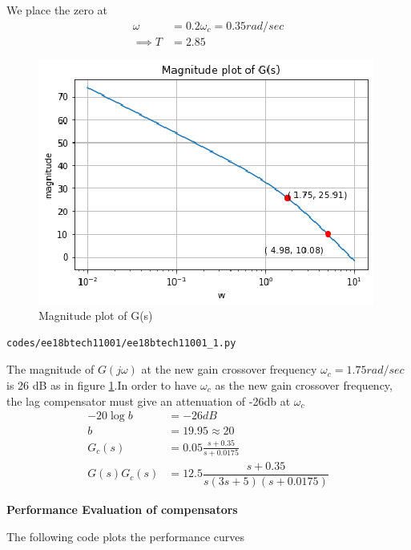 We place the zero at 
\begin{align} 
   \omega &= 0.2\omega_{c} = 0.35 rad/sec 
   \\
   \implies T &= 2.85
\end{align}
\begin{figure}[!ht]
\centering
    \includegraphics[width=\columnwidth]{./figs/ee18btech11001/ee18btech11001_2.eps}
  \caption{Magnitude plot of G(s)}
  \label{fig:ee18btech11001_fig3}
\end{figure}
\begin{lstlisting}
codes/ee18btech11001/ee18btech11001_1.py
\end{lstlisting}

The magnitude of $G(j\omega)$ at the new gain crossover frequency  $\omega_{c} = 1.75 rad/sec$ is 26 dB as in figure \ref{fig:ee18btech11001_fig3}.In order to have $\omega_{c}$  as the new gain crossover frequency, the lag compensator
must give an attenuation of -26db at $\omega_{c}$
\begin{align}
    -20 \log{b} &= -26dB
    \\
    b &= 19.95 \approx 20
    \\
    G_{c}(s) &=  0.05\frac{s + 0.35}{s + 0.0175}
    \\
    G(s)G_{c}(s) &= 12.5 \dfrac{s+0.35}{s(3s+5)(s+0.0175)} \label{eq:ee18btech11001_12}
\end{align}


\textbf{Performance Evaluation of compensators}

The following code plots the performance curves

